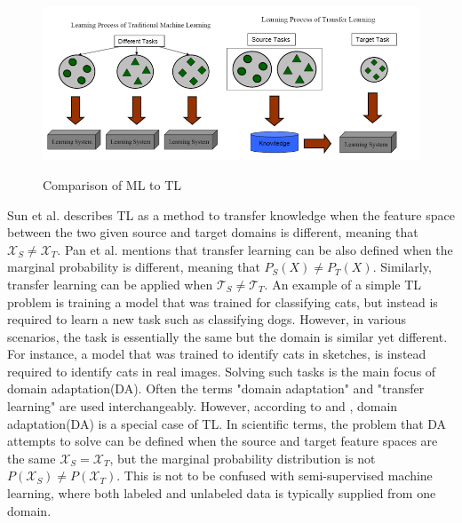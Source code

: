 \documentclass[english, 12pt, a4paper, elec, utf8, a-1b, online]{aaltothesis}
\begin{document}
 
\begin{figure}[htb]
	\begin{center}
		\includegraphics[width=16cm]{./TL.png}
	\end{center}
	\caption{Comparison of ML to TL\cite{Pan2010}}
	\begin{center}
		\label{TL}
	\end{center}
\end{figure}
\FloatBarrier

Sun et al. \cite{SUN201584} describes TL as a method to transfer knowledge when the feature space between the two given source and target domains is different, meaning that $\mathcal{X}_{S} \neq \mathcal{X}_{T}$. Pan et al. \cite{Pan2010} mentions that transfer learning can be also defined when the marginal probability is different, meaning that $P_{S}(X) \neq P_{T}(X)$. Similarly, transfer learning can be applied when $\mathcal{T}_{S} \neq \mathcal{T}_{T}$. An example of a simple TL problem is training a model that was trained for classifying cats, but instead is  required to learn a new task such as classifying dogs. However, in various scenarios, the task is essentially the same but the domain is similar yet different. For instance, a model that was trained to identify cats in sketches, is instead required to identify cats in real images. Solving such tasks is the main focus of domain adaptation(DA). Often the terms "domain adaptation" and "transfer learning" are used interchangeably. However, according to \cite{Wang2018} and \cite{Zhang2021}, domain adaptation(DA) is a special case of TL. In scientific terms, the problem that DA attempts to solve can be defined when the source and target feature spaces are the same $\mathcal{X}_{S}=\mathcal{X}_{T}$, but the marginal probability distribution is not $P\left(\mathcal{X}_{S}\right) \neq P\left(\mathcal{X}_{T}\right)$\cite{SUN201584}. This is not to be confused with semi-supervised machine learning, where both labeled and unlabeled data is typically supplied from one domain\cite{SUN201584}. 
\end{document}
